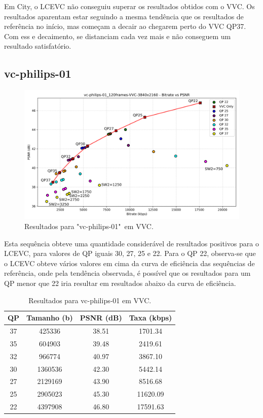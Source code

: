 Em City, o \acrshort{LCEVC} não conseguiu superar os resultados obtidos com o \acrshort{VVC}.
Os resultados aparentam estar seguindo a mesma tendência que os resultados de referência no
início, mas começam a decair ao chegarem perto do \acrshort{VVC} QP37. Com ess
e decaimento, 
se distanciam cada vez mais e não conseguem um resultado satisfatório.

\newpage

\subsection{vc-philips-01}

\begin{figure}[h]
    \centering
    \includegraphics[width=1.0\textwidth]{img/vc-philips-01_120frames-VVC.png}
    \caption{Resultados para "vc-philips-01"\ em \acrshort{VVC}.}
    \label{fig:vc-philips-01-VVC}
\end{figure}

Esta sequência obteve uma quantidade considerável de resultados positivos para o \acrshort{LCEVC}, para valores de
QP iguais 30, 27, 25 e 22. Para o QP 22, observa-se que o \acrshort{LCEVC} obteve
vários valores em cima da curva de eficiência das sequências de referência, onde
pela tendência observada, é possível que os resultados para um QP menor que 22 iria
resultar em resultados abaixo da curva de eficiência.

\begin{table}[h]
    \centering
    \begin{tabular}{|c|c|c|c|}
        \hline
        \textbf{QP} & \textbf{Tamanho (b)} & \textbf{PSNR (dB)} & \textbf{Taxa (kbps)} \\
        \hline
        37 & 425336 & 38.51 & 1701.34 \\
        35 & 604903 & 39.48 & 2419.61 \\
        32 & 966774 & 40.97 & 3867.10 \\
        30 & 1360536 & 42.30 & 5442.14 \\
        27 & 2129169 & 43.90 & 8516.68 \\
        25 & 2905023 & 45.30 & 11620.09 \\
        22 & 4397908 & 46.80 & 17591.63 \\
        \hline
    \end{tabular}
    \caption{Resultados para vc-philips-01 em VVC.}
    \label{tab:vc-philips-01-vvc}
\end{table}

